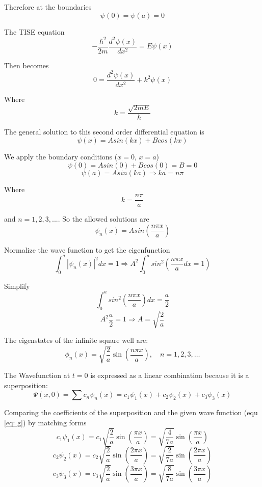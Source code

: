 \documentclass[12pt]{article}
\begin{document}
        Therefore at the boundaries
        \[
            \psi(0) = \psi(a) = 0
        \]

        The TISE equation 
        \[
            -\frac{\hbar^2}{2 m} \frac{d^2 \psi(x)}{dx^2} = E \psi(x)
        \]

        Then becomes
        \[
            0 = \frac{d^2 \psi(x)}{dx^2} + k^2 \psi(x)
        \]

        Where 
        \begin{equation} \label{eq: k}
            k = \frac{\sqrt{2 m E}}{\hbar}
        \end{equation}
        
        The general solution to this second order differential equation is 
        \[
            \psi(x) = A sin(kx) + B cos(kx)
        \]

        We apply the boundary conditions ($x=0$, $x=a$)
        \[
            \psi(0) = A sin(0) + B cos(0) = B = 0
        \]
        \[
            \psi(a) = A sin(ka) \Rightarrow ka=n\pi
        \]

        Where 
        \begin{equation} \label{eq: k2}
            k=\frac{n \pi}{a}    
        \end{equation}
        
        and $n=1,2,3,...$. So the allowed solutions are 
        \[
            \psi_n(x) = A sin(\frac{n \pi x}{a})
        \]

        Normalize the wave function to get the eigenfunction
        \[
            \int_0^a |\psi_n(x)|^2dx = 1 \Rightarrow A^2 \int_0^a sin^2 \left(\frac{n \pi x}{a} dx = 1 \right)
        \]

        Simplify
        \[
            \int_0^a sin^2 \left( \frac{n \pi x}{a} \right) dx = \frac{a}{2}
        \]
        \[
            A^2 \frac{a}{2} = 1 \Rightarrow A = \sqrt{\frac{2}{a}}
        \]

        The eigenstates of the infinite square well are:
        \[
            \phi_n(x) = \sqrt{\frac{2}{a}} \sin\left( \frac{n\pi x}{a} \right), \quad n=1,2,3,\ldots
        \]

        The Wavefunction at $t=0$ is expressed as a linear combination because it is a superposition:
        \[
            \Psi(x,0) = \sum c_n\psi_n(x) = c_1 \psi_1(x) + c_2 \psi_2(x) + c_3 \psi_3(x)
        \]

        Comparing the coefficients of the superposition and the given wave function (equ \ref{eq: g}) by matching forms
        \[
            c_1 \psi_1(x) = c_1 \sqrt{\frac{2}{a}} \sin \left( \frac{\pi x}{a} \right) = \sqrt{\frac{4}{7a}} \sin \left( \frac{\pi x}{a} \right)
        \]
        \[
            c_2 \psi_2(x) = c_2 \sqrt{\frac{2}{a}} \sin\left( \frac{2\pi x}{a} \right) = \sqrt{\frac{2}{7a}} \sin\left( \frac{2\pi x}{a} \right)
        \]
        \[
            c_3 \psi_3(x) = c_3 \sqrt{\frac{2}{a}} \sin\left( \frac{3\pi x}{a} \right) = \sqrt{\frac{8}{7a}} \sin\left( \frac{3\pi x}{a} \right)
        \]
\end{document}
